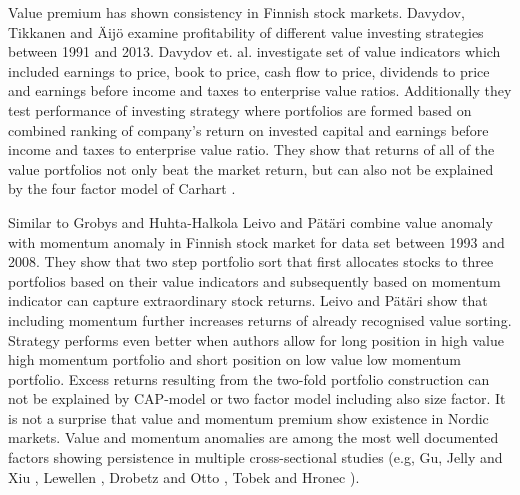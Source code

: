 \documentclass{article}
\begin{document}
Value premium has shown consistency in Finnish stock markets. Davydov, Tikkanen and Äijö \citeyear{Davydov2017MagicFV} examine profitability of different value investing strategies between 1991 and 2013. Davydov et. al. investigate set of value indicators which included earnings to price, book to price, cash flow to price, dividends to price and earnings before income and taxes to enterprise value ratios. Additionally they test performance of investing strategy where portfolios are formed based on combined ranking of company's return on invested capital and earnings before income and taxes to enterprise value ratio. They show that returns of all of the value portfolios not only beat the market return, but can also not be explained by the four factor model of Carhart \citeyear{Carhart1997}.  \par

Similar to Grobys and Huhta-Halkola \citeyear{grobys} Leivo and Pätäri \citeyear{leivo2011} combine value anomaly with momentum anomaly in Finnish stock market for data set between 1993 and 2008. They show that two step portfolio sort that first allocates stocks to three portfolios based on their value indicators and subsequently based on momentum indicator can capture extraordinary stock returns. Leivo and Pätäri show that including momentum further increases returns of already recognised value sorting. Strategy performs even better when authors allow for long position in high value high momentum portfolio and short position on low value low momentum portfolio. Excess returns resulting from the two-fold portfolio construction can not be explained by CAP-model or two factor model including also size factor. It is not a surprise that value and momentum premium show existence in Nordic markets. Value and momentum anomalies are among the most well documented factors showing persistence in multiple cross-sectional studies (e.g, Gu, Jelly and Xiu \citeyear{guetal}, Lewellen \citeyear{Lewellen2015}, Drobetz and Otto \citeyear{Drobetz}, Tobek and Hronec \citeyear{TOBEK2021100588}). \par
\end{document}
